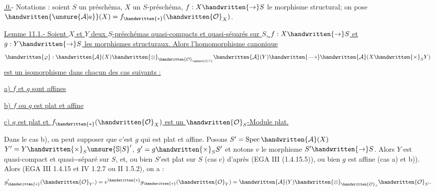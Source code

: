 \uline{.0.}- Notations : soient $S$ un préschéma, $X$ un $S$-préschéma, $f:X\handwritten{\to}S$ le morphisme structural; on pose $\handwritten{\unsure{\mathcal{A}|a}}(X)=f_{\handwritten{*}}(\handwritten{\mathcal{O}}_X)$.

\uline{Lemme 11.1.- Soient $X$ et $Y$ deux $S$-préschémas quasi-compacts et quasi-séparés sur $S$, $f:X\handwritten{\to}S$ et $g:Y\handwritten{\to}S$ les morphismes structuraux. Alors l'homomorphisme canonique}
\[
\handwritten{\varphi}:\handwritten{\mathcal{A}}(X)\handwritten{\otimes}_{\handwritten{\mathcal{O}}_{\unsure{\mathbb{S}|S}}}\handwritten{\mathcal{A}}(Y)\handwritten{\longrightarrow}\handwritten{\mathcal{A}}(X\handwritten{\times}_S Y)
\]
\uline{est un isomorphisme dans chacun des cas suivants :}

\uline{a) $f$ et $g$ sont affines}

\uline{b) $f$ ou $g$ est plat et affine}

\uline{c) $g$ est plat et $f_{\handwritten{*}}(\handwritten{\mathcal{O}}_X)$ est un $\handwritten{\mathcal{O}}_S$-Module plat.}

Dans le cas b), on peut supposer que c'est $g$ qui est plat et affine. Posons $S'=\operatorname{Spec}\handwritten{\mathcal{A}}(X)$ $Y'=Y\handwritten{\times}_S\unsure{\mathbb{S}|S}'$, $g'=g\handwritten{\times}_S S'$ et notons $v$ le morphisme $S'\handwritten{\to}S$. Alors $Y$ est quasi-compact et quasi-\linebreak -séparé sur $S$, et, ou bien $S'$est plat sur $S$ (cas c) d'après (EGA III (1.4.15.5)), ou bien $g$ est affine (cas a) et b)). Alors (EGA III 1.4.15 et IV 1.2.7 ou II 1.5.2), on a :
\[
g'_{\handwritten{*}}(\handwritten{\mathcal{O}}_{Y'})=v^{\handwritten{*}}g_{\handwritten{*}}(\handwritten{\mathcal{O}}_Y)=\handwritten{\mathcal{A}}(Y)\handwritten{\otimes}_{\handwritten{\mathcal{O}}_S}\handwritten{\mathcal{O}}_{S'}.
\]

